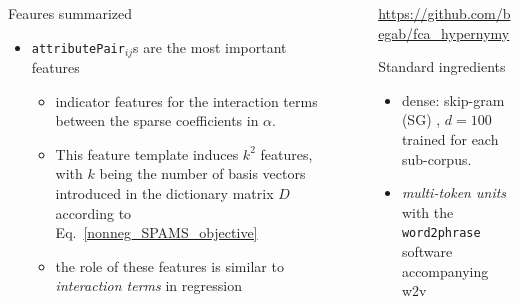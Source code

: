 \documentclass{beamer}
\newlength{\sepwid}
\newlength{\onecolwid}
\begin{document}
\begin{frame}[t]
\begin{columns}[t]
\begin{column}{\onecolwid}
\begin{block}{Feaures summarized}
\begin{itemize}
  \item \texttt{attributePair}$_{ij}$s are the most important features
    \begin{itemize}
      \item indicator features for the interaction terms between the sparse
        coefficients in $\alpha$.
      \item This feature template induces $k^2$ features, with $k$ being the
        number of basis vectors introduced in the dictionary matrix $D$
        according to Eq.~\ref{nonneg_SPAMS_objective}
      \item the role of these features is similar to \emph{interaction terms}
        in regression
    \end{itemize}
\end{itemize}
\end{block}
\end{column} 

\begin{column}{\sepwid} %
\end{column}   

\begin{column}{\onecolwid}

  \begin{alertblock}{}
    \url{https://github.com/begab/fca_hypernymy}
  \end{alertblock}

  \begin{block}{Standard ingredients}
    \begin{itemize}
      \item dense: skip-gram (SG) \citep{Mikolov:2013f}, $d=100$ trained for each
        sub-corpus. 
      \item \emph{multi-token units} with the \texttt{word2phrase}
        software accompanying w2v 
    \end{itemize}
  \end{block}


\end{column}
\end{columns}
\end{frame}
\end{document}

